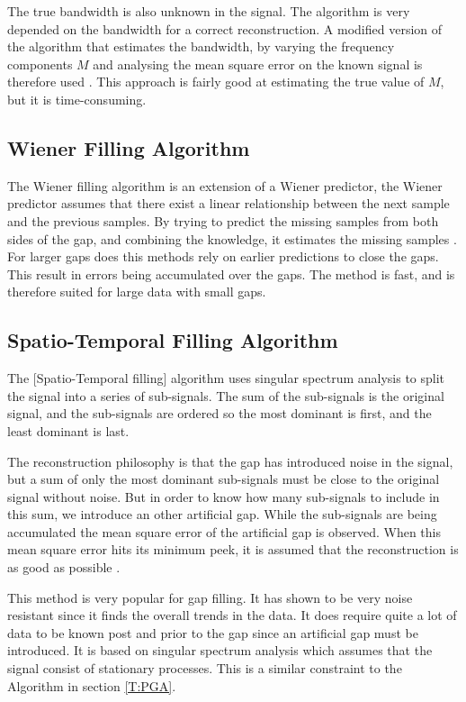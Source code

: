 The true bandwidth is also unknown in the signal. The  algorithm is very depended on the bandwidth for a correct reconstruction. A modified version of the algorithm that estimates the bandwidth, by varying the frequency components $M$ and analysing the mean square error on the known signal is therefore used \cite{RefWorks:13}. This approach is fairly good at estimating the true value of $M$, but it is time-consuming.

\subsection{Wiener Filling Algorithm}
The Wiener filling algorithm is an extension of a Wiener predictor, the Wiener predictor assumes that there exist a linear relationship between the next sample and the previous samples. By trying to predict the missing samples from both sides of the gap, and combining the knowledge, it estimates the missing samples \citep{RefWorks:14}. For larger gaps does this methods rely on earlier predictions to close the gaps. This result in errors being accumulated over the gaps. The method is fast, and is therefore suited for large data with small gaps. 

\subsection{Spatio-Temporal Filling Algorithm}
The [Spatio-Temporal filling] algorithm uses singular spectrum analysis to split the signal into a series of sub-signals. The sum of the sub-signals is the original signal, and the sub-signals are ordered so the most dominant is first, and the least dominant is last. 

The reconstruction philosophy is that the gap has introduced noise in the signal, but a sum of only the most dominant sub-signals must be close to the original signal without noise. But in order to know how many sub-signals to include in this sum, we introduce an other artificial gap. While the sub-signals are being accumulated the mean square error of the artificial gap is observed. When this mean square error hits its minimum peek, it is assumed that the reconstruction is as good as possible \cite{RefWorks:15}.

This method is very popular for gap filling. It has shown to be very noise resistant since it finds the overall trends in the data. It does require quite a lot of data to be known post and prior to the gap since an artificial gap must be introduced. It is based on singular spectrum analysis which assumes that the signal consist of stationary processes. This is a similar constraint to the  Algorithm in section \ref{T:PGA}.

